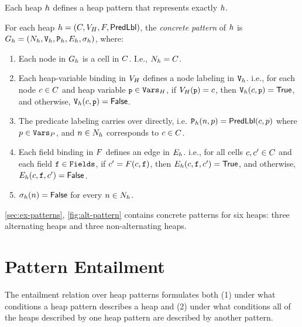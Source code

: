 Each heap $h$ defines a heap pattern that represents exactly
$h$.
%
\begin{defn}
  \label{defn:heap-pat}
  For each heap $h = (C, V_H, F, \mathsf{PredLbl})$, the
  \emph{concrete pattern} of $h$ is $G_{h} =
  (N_{h}, \mathtt{V}_{h}, \mathtt{P}_{h}, E_{h}, \sigma_{h})$,
  where:
  \begin{enumerate}
  \item
    Each node in $G_{h}$ is a cell in $C$.
    I.e., $N_{h} = C$.
  \item
    Each heap-variable binding in $V_H$ defines a node labeling
    in $\mathtt{V}_{h}$.
    i.e., for each node $c \in C$ and heap variable $\cc{p} \in
    \heapvars$, if $\heapvarnm(\cc{p}) = c$, then
    $\varlblnm_{\heapnm}(c, \cc{p}) = \true$, and otherwise,
    $\varlblnm_{\heapnm}(c, \cc{p}) = \false$.
  \item
    The predicate labeling carries over directly, i.e. $\mathtt{P}_{h}(n, p) = \mathsf{PredLbl}(c, p)$ where $p \in \mathtt{Vars}_P$, and $n \in N_{h}$ corresponds to $c \in C$.
  \item
    Each field binding in $F$ defines an edge in
    $E_{h}$.
    i.e., for all cells $c, c' \in C$ and each
    field $\mathtt{f} \in \mathtt{Fields}$, if $c' = F(c,
    \mathtt{f})$, then $E_{h}(c, \mathtt{f}, c')
    = \mathsf{True}$, and otherwise, $E_{h}(c, \mathtt{f},
    c') = \mathsf{False}$.
  \item
    $\sigma_{h}(n) = \mathsf{False}$ for every $n \in N_{h}$.
  \end{enumerate}
\end{defn}
\begin{ex}
  \label{ex:concrete-heaps-defn}
  \autoref{sec:ex-patterns}, \autoref{fig:alt-pattern} contains
  concrete patterns for six heaps: three alternating heaps and three
  non-alternating heaps.
\end{ex}

\section{Pattern Entailment}
\label{sec:entailment-algorithm}
The entailment relation over heap patterns formulates both (1)
under what conditions a heap pattern describes a heap and (2) under
what conditions all of the heaps described by one heap pattern are
described by another pattern.
%

